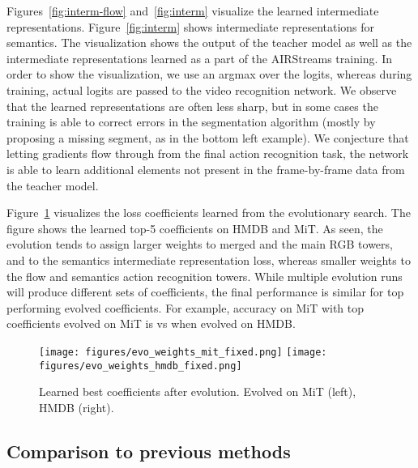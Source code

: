 \documentclass[final]{cvpr}
\begin{document}
Figures~\ref{fig:interm-flow} and~\ref{fig:interm} visualize the learned intermediate representations.
Figure~\ref{fig:interm} shows intermediate representations for semantics. The visualization shows the output of the teacher model as well as the intermediate representations learned as a part of the AIRStreams training.
In order to show the visualization, we use an argmax over the logits, whereas during training, actual logits are passed to the video recognition network. We observe that the learned representations are often less sharp, but in some cases the training is able to correct errors in the segmentation algorithm (mostly by proposing a missing segment, as in the bottom left example). We conjecture that letting gradients flow through from the final action recognition task, the network is able to learn additional elements not present in the frame-by-frame data from the teacher model.







Figure~\ref{fig:evo_weights} visualizes the loss coefficients learned from the evolutionary search. The figure shows the learned top-5 coefficients on HMDB and MiT. As seen, the evolution tends to assign larger weights to merged and the main RGB towers, and to the semantics intermediate representation loss, whereas smaller weights to the flow and semantics action recognition towers.
While multiple evolution runs will produce different sets of coefficients, the final performance is similar for top performing evolved coefficients. For example, accuracy on MiT with top coefficients evolved on MiT is  vs  when evolved on HMDB. 




\begin{figure}
  \centering
\texttt{[image: figures/evo\_weights\_mit\_fixed.png]}
  \texttt{[image: figures/evo\_weights\_hmdb\_fixed.png]}
\caption{Learned best coefficients after evolution. Evolved on MiT (left), HMDB (right).}
\label{fig:evo_weights}
\end{figure}











\subsection{Comparison to previous methods}
\end{document}
